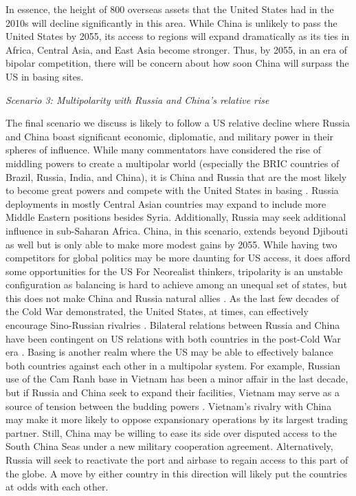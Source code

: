 In essence, the height of 800 overseas assets that the United States had in the 2010s will decline significantly in this area. While China is unlikely to pass the United States by 2055, its access to regions will expand dramatically as its ties in Africa, Central Asia, and East Asia become stronger. Thus, by 2055, in an era of bipolar competition, there will be concern about how soon China will surpass the US in basing sites. 

\textit{Scenario 3: Multipolarity with Russia and China's relative rise}

The final scenario we discuss is likely to follow a US relative decline where Russia and China boast significant economic, diplomatic, and military power in their spheres of influence. While many commentators have considered the rise of middling powers to create a multipolar world (especially the BRIC countries of Brazil, Russia, India, and China), it is China and Russia that are the most likely to become great powers and compete with the United States in basing \cite{cooper2013,Mattis2018,Cooley2020}. Russia deployments in mostly Central Asian countries may expand to include more Middle Eastern positions besides Syria. Additionally, Russia may seek additional influence in sub-Saharan Africa. China, in this scenario, extends beyond Djibouti as well but is only able to make more modest gains by 2055. While having two competitors for global politics may be more daunting for US access, it does afford some opportunities for the US For Neorealist thinkers, tripolarity is an unstable configuration as balancing is hard to achieve among an unequal set of states, but this does not make China and Russia natural allies \cite{Waltz1979}. As the last few decades of the Cold War demonstrated, the United States, at times, can effectively encourage Sino-Russian rivalries \cite{goh2005}. Bilateral relations between Russia and China have been contingent on US relations with both countries in the post-Cold War era \cite{ferdinand2007}. Basing is another realm where the US may be able to effectively balance both countries against each other in a multipolar system. For example, Russian use of the Cam Ranh base in Vietnam has been a minor affair in the last decade, but if Russia and China seek to expand their facilities, Vietnam may serve as a source of tension between the budding powers \cite{yen2021}. Vietnam's rivalry with China may make it more likely to oppose expansionary operations by its largest trading partner. Still, China may be willing to ease its side over disputed access to the South China Seas under a new military cooperation agreement. Alternatively, Russia will seek to reactivate the port and airbase to regain access to this part of the globe. A move by either country in this direction will likely put the countries at odds with each other.

